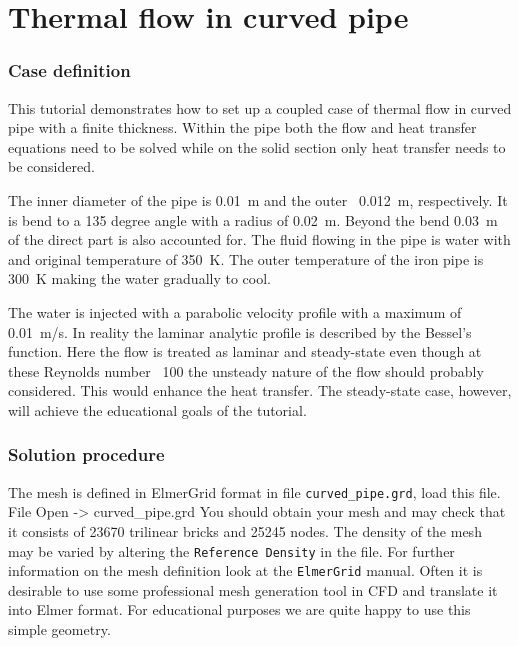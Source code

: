 \chapter{Thermal flow in curved pipe}



\subsection*{Case definition}
 

This tutorial demonstrates how to set up a coupled case
of thermal flow in curved pipe with a finite thickness. Within the pipe 
both the flow and heat transfer equations need to be solved while on the
solid section only heat transfer needs to be considered. 

The inner diameter of the pipe is 0.01~m and the outer ~0.012~m, respectively. 
It is bend to a 135 degree angle with a radius of 0.02~m. Beyond the bend
0.03~m of the direct part is also accounted for. 
The fluid flowing in the pipe is water with and original temperature of 350~K. 
The outer temperature of the iron pipe is 300~K making the water
gradually to cool. 

The water is injected with a parabolic velocity profile with a maximum
of 0.01~m/s. In reality the laminar analytic profile is described by the 
Bessel's function. Here the flow is treated as laminar and steady-state 
even though at these Reynolds number ~100 the unsteady nature of the 
flow should probably considered. This would enhance the heat transfer.
The steady-state case, however, will achieve the educational goals of the tutorial.

\subsection*{Solution procedure}

The mesh is defined in ElmerGrid format in file \texttt{curved\_pipe.grd}, load this file.
\ttbegin
File 
  Open -> curved\_pipe.grd
\ttend
You should obtain your mesh and may check that it consists of 23670 trilinear 
bricks and 25245 nodes. The density of the mesh may be varied by altering
the \texttt{Reference Density} in the file. For further information on
the mesh definition look at the \texttt{ElmerGrid} manual. Often it is 
desirable to use some professional mesh generation tool in CFD and 
translate it into Elmer format. For educational purposes we are 
quite happy to use this simple geometry.  

